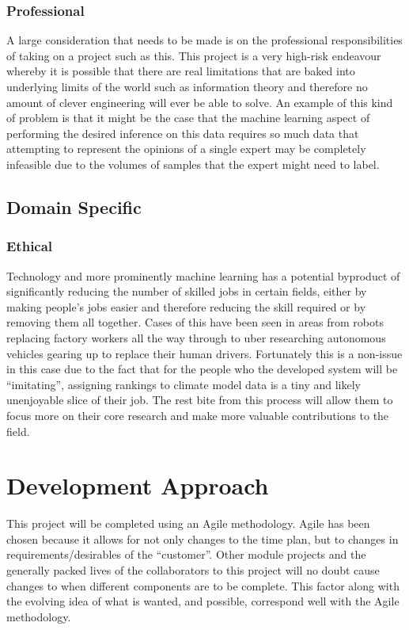\documentclass{ecmm427_assignment}
\begin{document}
\subsubsection{Professional}

\quad A large consideration that needs to be made is on the professional
responsibilities of taking on a project such as this. This project
is a very high-risk endeavour whereby it is possible that there
are real limitations that are baked into underlying limits of the world
such as information theory and therefore no amount of clever engineering
will ever be able to solve. An example of this kind of problem is
that it might be the case that the machine learning aspect of performing
the desired inference on this data requires so much data that attempting
to represent the opinions of a single expert may be completely infeasible
due to the volumes of samples that the expert might need to label. 

\subsection{Domain Specific}

\subsubsection{Ethical}

\quad Technology and more prominently machine learning has 
a potential byproduct of significantly reducing the number of skilled
jobs in certain fields, either by making people's jobs easier and
therefore reducing the skill required or by removing them all together.
Cases of this have been seen in areas from robots replacing factory
workers all the way through to uber researching autonomous vehicles
gearing up to replace their human drivers. Fortunately this is a non-issue
in this case due to the fact that for the people who the developed
system will be ``imitating'', assigning rankings to climate model
data is a tiny and likely unenjoyable slice of their job. The rest bite
from this process will allow them to focus more on their core research
and make more valuable contributions to the field. 



\section{Development Approach}
\quad This project will be completed using an Agile methodology. Agile has been chosen because it allows for not only changes to the time plan, but to changes in requirements/desirables of the “customer”. Other module projects and the generally packed lives of the collaborators to this project will no doubt cause changes to when different components are to be complete. This factor along with the evolving idea of what is wanted, and possible, correspond well with the Agile methodology.\\
\end{document}
